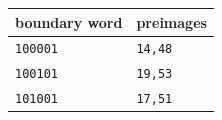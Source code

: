 \begin{tabular}{ll}%
\hline%
\textbf{boundary word}&\textbf{preimages}\\%
\hline%
\texttt{100001}&\texttt{14,48}\\%
\texttt{100101}&\texttt{19,53}\\%
\texttt{101001}&\texttt{17,51}\\%
\hline%
\end{tabular}
